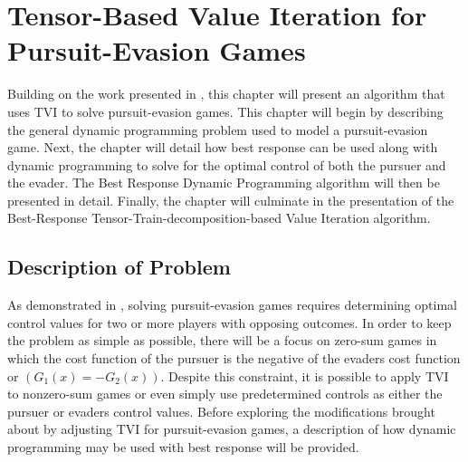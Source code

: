 \chapter{Tensor-Based Value Iteration for Pursuit-Evasion Games}\label{chp:tvipe}
Building on the work presented in , this chapter will present an algorithm that uses TVI to solve pursuit-evasion games. This chapter will begin by describing the general dynamic programming problem used to model a pursuit-evasion game. Next, the chapter will detail how best response can be used along with dynamic programming to solve for the optimal control of both the pursuer and the evader. The Best Response Dynamic Programming algorithm will then be presented in detail. Finally, the chapter will culminate in the presentation of the Best-Response Tensor-Train-decomposition-based Value Iteration algorithm.  

\section{Description of Problem}\label{peprobdes}
As demonstrated in , solving pursuit-evasion games requires determining optimal control values for two or more players with opposing outcomes. In order to keep the problem as simple as possible, there will be a focus on zero-sum games in which the cost function of the pursuer is the negative of the evaders cost function or $(G_1(x) = -G_2(x))$. Despite this constraint, it is possible to apply TVI to nonzero-sum games or even simply use predetermined controls as either the pursuer or evaders control values. Before exploring the modifications brought about by adjusting TVI for pursuit-evasion games, a description of how dynamic programming may be used with best response will be provided.

